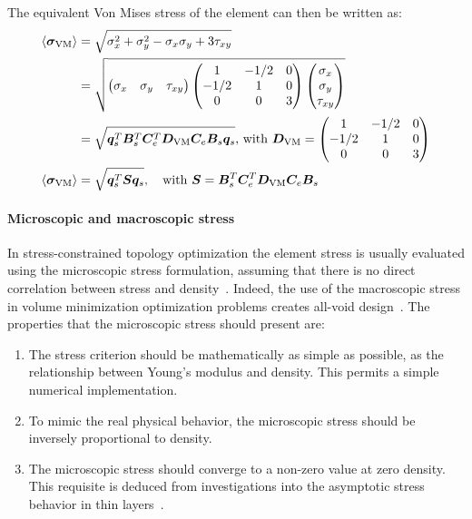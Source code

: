 The equivalent Von Mises stress of the element can then be written as:
\begin{align}
    \langle \bm{\sigma}_{\text{VM}} \rangle &= \sqrt{\sigma_x^2 + \sigma_y^2 - \sigma_x \sigma_y+3\tau_{xy}} \\
    &= \sqrt{
    \begin{pmatrix}
    \sigma_x & \sigma_y & \tau_{xy}
    \end{pmatrix}
    \begin{pmatrix}
    1       &   -1/2    &   0   \\
    -1/2    &   1       &   0   \\
    0       &   0       &   3
    \end{pmatrix}
    \begin{pmatrix}
    \sigma_x \\
    \sigma_y \\
    \tau_{xy}
    \end{pmatrix}} \\
    &= \sqrt{\bm{q}_s^T\bm{B}_s^T\bm{C}_e^T\bm{D}_{\text{VM}}\bm{C}_e\bm{B}_s\bm{q}_s}
    \textrm{,  with } \bm{D}_{\text{VM}} = 
    \begin{pmatrix}
    1       &   -1/2    &   0   \\
    -1/2    &   1       &   0   \\
    0       &   0       &   3
    \end{pmatrix} \\
    \langle \bm{\sigma}_{\text{VM}} \rangle &= \sqrt{\bm{q}_s^T\bm{S}\bm{q}_s}, \quad
    \textrm{with } \bm{S} = \bm{B}_s^T\bm{C}_e^T\bm{D}_{\text{VM}}\bm{C}_e\bm{B}_s
    \label{eq:03_VM_calc}
\end{align}

\paragraph{Microscopic and macroscopic stress}
In stress-constrained topology optimization the element stress is usually evaluated using the microscopic stress formulation, assuming that there is no direct correlation between stress and density~. Indeed, the use of the macroscopic stress in volume minimization optimization problems creates all-void design~. The properties that the microscopic stress should present are:
\begin{enumerate}[label=(\roman*)]
    \item The stress criterion should be mathematically as simple as possible, as the relationship between Young's modulus and density. This permits a simple numerical implementation.
    \item To mimic the real physical behavior, the microscopic stress should be inversely proportional to density.
    \item The microscopic stress should converge to a non-zero value at zero density. This requisite is deduced from investigations into the asymptotic stress behavior in thin layers~.
\end{enumerate}

